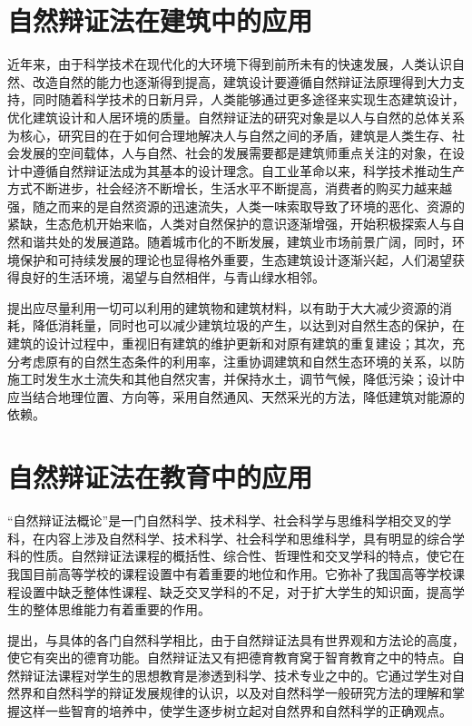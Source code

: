 \documentclass[UTF8,a4paper]{ctexart}
\begin{document}
\section{自然辩证法在建筑中的应用}
近年来，由于科学技术在现代化的大环境下得到前所未有的快速发展，人类认识自然、改造自然的能力也逐渐得到提高，建筑设计要遵循自然辩证法原理得到大力支持，同时随着科学技术的日新月异，人类能够通过更多途径来实现生态建筑设计，优化建筑设计和人居环境的质量。自然辩证法的研究对象是以人与自然的总体关系为核心，研究目的在于如何合理地解决人与自然之间的矛盾，建筑是人类生存、社会发展的空间载体，人与自然、社会的发展需要都是建筑师重点关注的对象，在设计中遵循自然辩证法成为其基本的设计理念。自工业革命以来，科学技术推动生产方式不断进步，社会经济不断增长，生活水平不断提高，消费者的购买力越来越强，随之而来的是自然资源的迅速流失，人类一味索取导致了环境的恶化、资源的紧缺，生态危机开始来临，人类对自然保护的意识逐渐增强，开始积极探索人与自然和谐共处的发展道路。随着城市化的不断发展，建筑业市场前景广阔，同时，环境保护和可持续发展的理论也显得格外重要，生态建筑设计逐渐兴起，人们渴望获得良好的生活环境，渴望与自然相伴，与青山绿水相邻。
\par
\cite{RN11}提出应尽量利用一切可以利用的建筑物和建筑材料，以有助于大大减少资源的消耗，降低消耗量，同时也可以减少建筑垃圾的产生，以达到对自然生态的保护，在建筑的设计过程中，重视旧有建筑的维护更新和对原有建筑的重复建设；其次，充分考虑原有的自然生态条件的利用率，注重协调建筑和自然生态环境的关系，以防施工时发生水土流失和其他自然灾害，并保持水土，调节气候，降低污染；设计中应当结合地理位置、方向等，采用自然通风、天然采光的方法，降低建筑对能源的依赖。

\section{自然辩证法在教育中的应用}
“自然辩证法概论”是一门自然科学、技术科学、社会科学与思维科学相交叉的学科，在内容上涉及自然科学、技术科学、社会科学和思维科学，具有明显的综合学科的性质。自然辩证法课程的概括性、综合性、哲理性和交叉学科的特点，使它在我国目前高等学校的课程设置中有着重要的地位和作用。它弥补了我国高等学校课程设置中缺乏整体性课程、缺乏交叉学科的不足，对于扩大学生的知识面，提高学生的整体思维能力有着重要的作用。
\par
\cite{RN13}提出，与具体的各门自然科学相比，由于自然辩证法具有世界观和方法论的高度，使它有突出的德育功能。自然辩证法又有把德育教育窝于智育教育之中的特点。自然辩证法课程对学生的思想教育是渗透到科学、技术专业之中的。它通过学生对自然界和自然科学的辩证发展规律的认识，以及对自然科学一般研究方法的理解和掌握这样一些智育的培养中，使学生逐步树立起对自然界和自然科学的正确观点。
\end{document}
